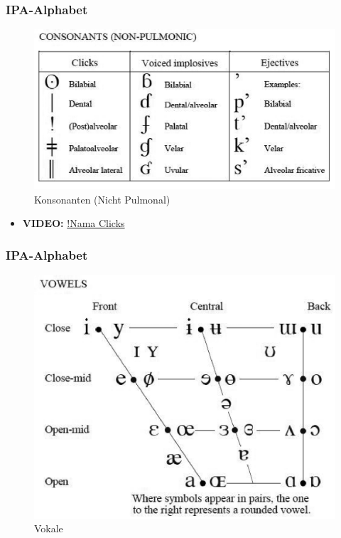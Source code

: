 
\begin{frame}
\frametitle{IPA-Alphabet}

	\begin{figure}[H]
		\centering
		
		\includegraphics[scale=0.45]{material/04ipaconsonantnonpulmonic}
		\caption{Konsonanten (Nicht Pulmonal)}
	\end{figure}
	
	\begin{itemize}
		\item \textbf{VIDEO:} \href{run:material/04namaclicks.mp4}{!Nama Clicks}
	\end{itemize}
			
\end{frame}




\begin{frame}
\frametitle{IPA-Alphabet}

	\begin{figure}[H]
		\centering
		
		\includegraphics[scale=0.45]{material/04ipavowel}
		\caption{Vokale}
	\end{figure}
	
\end{frame}


